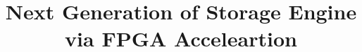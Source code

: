 \documentclass{vldb}
\begin{document}

\title{Next Generation of Storage Engine via FPGA Acceleartion}




%
%
%
%

\end{document}
